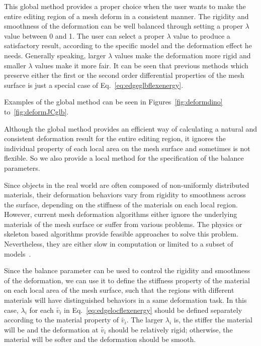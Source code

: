 This global method provides a  proper choice when the user wants to
make the entire editing region of a mesh deform in a consistent
manner. The rigidity and smoothness of the deformation can be well
balanced through setting a proper $\lambda$ value between 0 and 1.
The user can select a proper $\lambda$ value to produce a
satisfactory result, according to the specific model and the
deformation effect he needs. Generally speaking, larger $\lambda$
values make the deformation more rigid and smaller $\lambda$ values
make it more fair. It can be seen that previous methods which
preserve either the first or the second order differential
properties of the mesh surface is just a special case of
Eq.~\ref{eq:edgeglbflexenergy}.

Examples of the global method  can be seen in
Figures~\ref{fig:deformdino} to~\ref{fig:deformJCglb}.

Although the global method  provides an efficient way of calculating
a natural and consistent deformation result for the entire editing
region, it ignores the individual property of each local area on the
mesh surface and sometimes is not flexible. So we also provide a
local method for the specification of the balance parameters.

Since objects in the real world  are often composed of non-uniformly
distributed materials, their deformation behaviors vary from
rigidity to smoothness across the surface, depending on the
stiffness of the materials on each local region. However, current
mesh deformation algorithms either ignore the underlying materials
of the mesh surface or suffer from various problems. The physics or
skeleton based algorithms provide feasible approaches to solve this
problem. Nevertheless, they are either slow in computation or
limited to a subset of models~\cite{PJS05}.

Since the balance parameter can be used to  control the rigidity and
smoothness of the deformation, we can use it to define the stiffness
property of the material on each local area of the mesh surface,
such that the regions with different materials will have
distinguished behaviors in a same deformation task. In this case,
$\lambda_i$ for each $\tilde{v_i}$ in Eq.~\ref{eq:edgelocflexenergy}
should be defined separately according to the material property of
$\tilde{v_i}$. The larger $\lambda_i$ is, the stiffer the material
will be and the deformation at $\tilde{v_i}$ should be relatively
rigid; otherwise, the material will be softer and the deformation
should be smooth.

